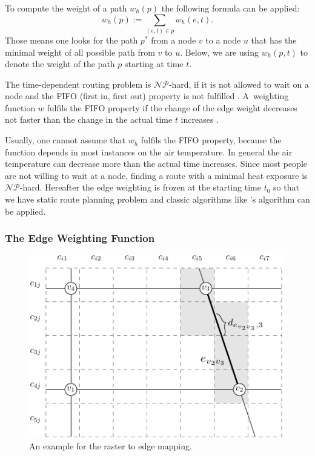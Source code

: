 To compute the weight of a path $w_h(p)$ the following formula can be applied:
	\begin{equation}\label{eq:path-weight}
		w_h(p) := \sum_{(e,t) \in p} w_h(e, t).
	\end{equation}
Those means one looks for the path $p^*$ from a node $v$ to a node $u$ that has the minimal weight of all possible path from $v$ to $u$. Below, we are using $w_h(p, t)$ to denote the weight of the path $p$ starting at time $t$. 

The time-dependent routing problem is $\mathcal{NP}$-hard, if it is not allowed to wait on a node and the FIFO (first in, first out) property is not fulfilled \parencite{Orda1990}. A~weighting function $w$ fulfils the FIFO property if the change of the edge weight decreases not faster than the change in the actual time $t$ increases \parencite{Kaufman1993}. 

Usually, one cannot assume that $w_h$ fulfils the FIFO property, because the function depends in most instances on the air temperature. In general the air temperature can decrease more than the actual time increases. Since most people are not willing to wait at a node, finding a route with a minimal heat exposure is $\mathcal{NP}$-hard.
Hereafter the edge weighting is frozen at the starting time $t_0$ so that we have static route planning problem and classic algorithms like  \citeauthor{Dijkstra1959}'s algorithm \parencite{Dijkstra1959} can be applied. 

\subsubsection{The Edge Weighting Function \label{sec:edge-weighting}}

\begin{figure}
	\centering
	\includegraphics{figures/raster-edge-mapping-standalone}
	\caption[Example for the raster to edge mapping]{An 
		example for the raster to edge mapping.}
	\label{fig:raster-edge-mapping}
\end{figure}

